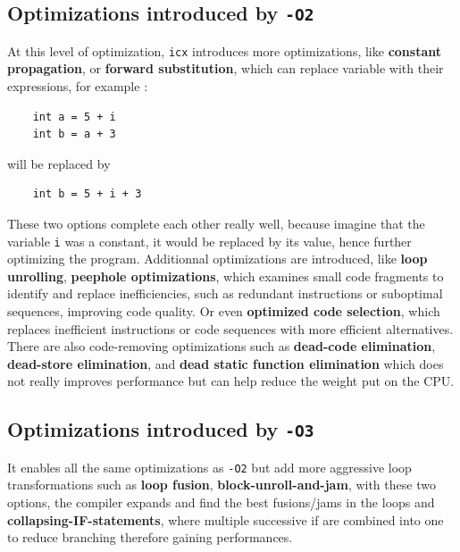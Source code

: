 \documentclass{rapport}
\newcommand{\icx}{\texttt{icx} }
\newcommand{\optitwo}{\texttt{-O2} }
\newcommand{\optithree}{\texttt{-O3} }
\begin{document}
\subsection*{Optimizations introduced by \optitwo}
At this level of optimization, \icx introduces more optimizations, like \textbf{constant propagation}, or \textbf{forward substitution}, which can replace variable with their expressions, for example : 
\begin{verbatim}
    int a = 5 + i
    int b = a + 3
\end{verbatim}
will be replaced by
\begin{verbatim}
    int b = 5 + i + 3
\end{verbatim}
These two options complete each other really well, because imagine that the variable \texttt{i} was a constant, it would be replaced by its value, hence further optimizing the program.
\newline\newline
Additionnal optimizations are introduced, like \textbf{loop unrolling}, \textbf{peephole optimizations}, which examines small code fragments to identify and replace inefficiencies,
such as redundant instructions or suboptimal sequences, improving code quality. Or even \textbf{optimized code selection}, which replaces inefficient instructions or code sequences with 
more efficient alternatives.
\newline\newline
There are also code-removing optimizations such as \textbf{dead-code elimination}, \textbf{dead-store elimination}, and \textbf{dead static function elimination} which does not really improves performance but can help reduce the weight put on the CPU.

\subsection*{Optimizations introduced by \optithree}
It enables all the same optimizations as \optitwo but add more aggressive loop transformations such as \textbf{loop fusion}, \textbf{block-unroll-and-jam}, with these two options, the compiler expands and find the best fusions/jams in the loops and \textbf{collapsing-IF-statements}, where multiple successive if are combined into one to reduce branching therefore gaining performances.
\end{document}
